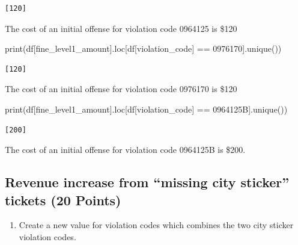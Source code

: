 \documentclass[
]{article}
\newenvironment{Shaded}{\begin{snugshade}}{\end{snugshade}}
\newcommand{\BuiltInTok}[1]{\textcolor[rgb]{0.00,0.23,0.31}{#1}}
\newcommand{\NormalTok}[1]{\textcolor[rgb]{0.00,0.23,0.31}{#1}}
\newcommand{\OperatorTok}[1]{\textcolor[rgb]{0.37,0.37,0.37}{#1}}
\newcommand{\StringTok}[1]{\textcolor[rgb]{0.13,0.47,0.30}{#1}}
\providecommand{\tightlist}{%
  \setlength{\itemsep}{0pt}\setlength{\parskip}{0pt}}\usepackage{longtable,booktabs,array}
\begin{document}
\begin{verbatim}
[120]
\end{verbatim}

The cost of an initial offense for violation code 0964125 is \$120

\begin{Shaded}
\begin{Highlighting}[]
\BuiltInTok{print}\NormalTok{(df[}\StringTok{\textquotesingle{}fine\_level1\_amount\textquotesingle{}}\NormalTok{].loc[df[}\StringTok{\textquotesingle{}violation\_code\textquotesingle{}}\NormalTok{] }\OperatorTok{==} \StringTok{\textquotesingle{}0976170\textquotesingle{}}\NormalTok{].unique())}
\end{Highlighting}
\end{Shaded}

\begin{verbatim}
[120]
\end{verbatim}

The cost of an initial offense for violation code 0976170 is \$120

\begin{Shaded}
\begin{Highlighting}[]
\BuiltInTok{print}\NormalTok{(df[}\StringTok{\textquotesingle{}fine\_level1\_amount\textquotesingle{}}\NormalTok{].loc[df[}\StringTok{\textquotesingle{}violation\_code\textquotesingle{}}\NormalTok{] }\OperatorTok{==} \StringTok{\textquotesingle{}0964125B\textquotesingle{}}\NormalTok{].unique())}
\end{Highlighting}
\end{Shaded}

\begin{verbatim}
[200]
\end{verbatim}

The cost of an initial offense for violation code 0964125B is \$200.

\subsection{Revenue increase from ``missing city sticker'' tickets (20
Points)}\label{revenue-increase-from-missing-city-sticker-tickets-20-points}

\begin{enumerate}
\def\labelenumi{\arabic{enumi}.}
\tightlist
\item
  Create a new value for violation codes which combines the two city
  sticker violation codes.
\end{enumerate}
\end{document}
